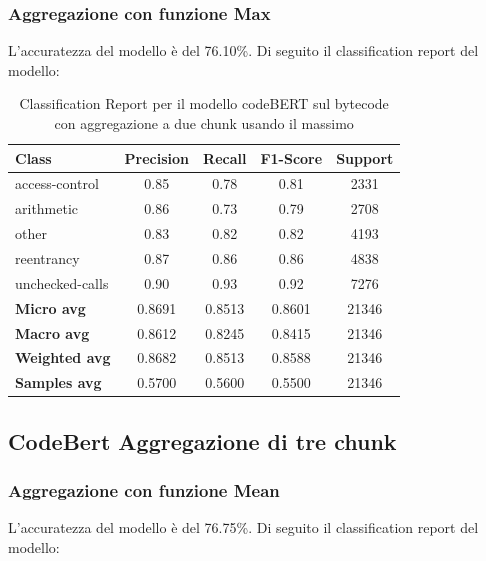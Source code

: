 \documentclass[../../Thesis.tex]{subfiles}
\begin{document}
    

\subsubsection{Aggregazione con funzione Max}
L'accuratezza del modello è del 76.10\%. Di seguito il classification report del modello:
\begin{table}[H]
    \centering
    \small
    \begin{tabular}{lcccc}
    \hline
    \textbf{Class} & \textbf{Precision} & \textbf{Recall} & \textbf{F1-Score} & \textbf{Support} \\
    \hline
    access-control & 0.85 & 0.78 & 0.81 & 2331 \\
    arithmetic & 0.86 & 0.73 & 0.79 & 2708 \\
    other & 0.83 & 0.82 & 0.82 & 4193 \\
    reentrancy & 0.87 & 0.86 & 0.86 & 4838 \\
    unchecked-calls & 0.90 & 0.93 & 0.92 & 7276 \\
    \hline
    \textbf{Micro avg} & 0.8691 & 0.8513 & 0.8601 & 21346 \\
    \textbf{Macro avg} & 0.8612 & 0.8245 & 0.8415 & 21346 \\
    \textbf{Weighted avg} & 0.8682 & 0.8513 & 0.8588 & 21346 \\
    \textbf{Samples avg} & 0.5700 & 0.5600 & 0.5500 & 21346 \\
    \hline
    \end{tabular}
    \caption{Classification Report per il modello codeBERT sul bytecode con aggregazione a due chunk usando il massimo}
    \end{table}

\subsection{CodeBert Aggregazione di tre chunk}
    \subsubsection{Aggregazione con funzione Mean}
    L'accuratezza del modello è del 76.75\%. Di seguito il classification report del modello:
    
\end{document}
